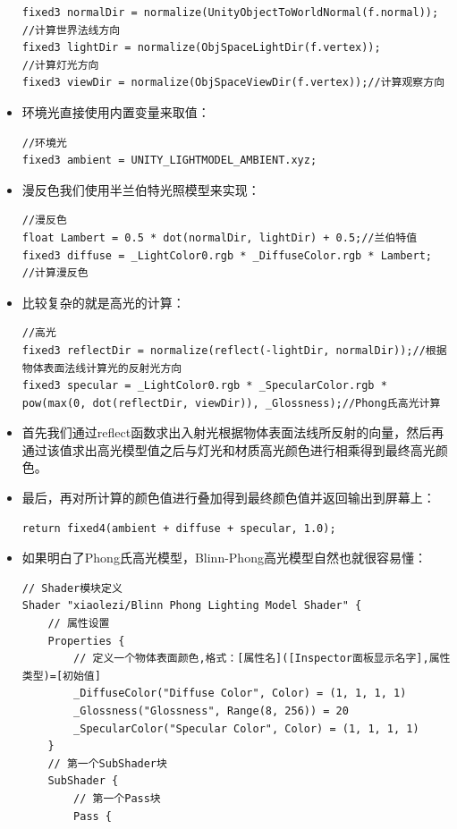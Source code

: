 \documentclass[9pt, b5paper]{article}
\begin{document}
\begin{itemize}
\begin{verbatim}
fixed3 normalDir = normalize(UnityObjectToWorldNormal(f.normal));   //计算世界法线方向  
fixed3 lightDir = normalize(ObjSpaceLightDir(f.vertex));            //计算灯光方向  
fixed3 viewDir = normalize(ObjSpaceViewDir(f.vertex));//计算观察方向
\end{verbatim}
\item 环境光直接使用内置变量来取值：
\begin{verbatim}
//环境光  
fixed3 ambient = UNITY_LIGHTMODEL_AMBIENT.xyz;
\end{verbatim}
\item 漫反色我们使用半兰伯特光照模型来实现：
\begin{verbatim}
//漫反色  
float Lambert = 0.5 * dot(normalDir, lightDir) + 0.5;//兰伯特值  
fixed3 diffuse = _LightColor0.rgb * _DiffuseColor.rgb * Lambert;    //计算漫反色
\end{verbatim}
\item 比较复杂的就是高光的计算：
\begin{verbatim}
//高光  
fixed3 reflectDir = normalize(reflect(-lightDir, normalDir));//根据物体表面法线计算光的反射光方向  
fixed3 specular = _LightColor0.rgb * _SpecularColor.rgb * pow(max(0, dot(reflectDir, viewDir)), _Glossness);//Phong氏高光计算
\end{verbatim}
\item 首先我们通过reflect函数求出入射光根据物体表面法线所反射的向量，然后再通过该值求出高光模型值之后与灯光和材质高光颜色进行相乘得到最终高光颜色。
\item 最后，再对所计算的颜色值进行叠加得到最终颜色值并返回输出到屏幕上：
\begin{verbatim}
return fixed4(ambient + diffuse + specular, 1.0);
\end{verbatim}
\item 如果明白了Phong氏高光模型，Blinn-Phong高光模型自然也就很容易懂：
\begin{verbatim}
// Shader模块定义  
Shader "xiaolezi/Blinn Phong Lighting Model Shader" {  
    // 属性设置  
    Properties {  
        // 定义一个物体表面颜色,格式：[属性名]([Inspector面板显示名字],属性类型)=[初始值]  
        _DiffuseColor("Diffuse Color", Color) = (1, 1, 1, 1)  
        _Glossness("Glossness", Range(8, 256)) = 20  
        _SpecularColor("Specular Color", Color) = (1, 1, 1, 1)  
    }  
    // 第一个SubShader块  
    SubShader {  
        // 第一个Pass块  
        Pass {  

\end{verbatim}
\end{itemize}
\end{document}
